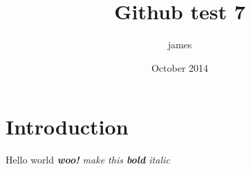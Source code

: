 \documentclass{article}
\title{Github test 7}
\author{james }
\date{October 2014}
\begin{document}
\maketitle

\section{Introduction}

Hello world \textit{\textbf{woo!} make this \textbf{bold} \textit{italic}}
\end{document}
